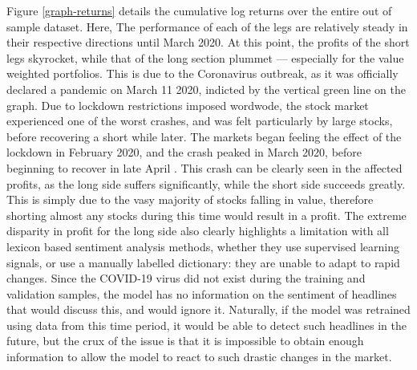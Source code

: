 Figure \ref{graph-returns} details the cumulative log returns over the entire out of sample dataset. Here, The performance of each of the legs are relatively steady in their respective directions until March 2020. At this point, the profits of the short legs skyrocket, while that of the long section plummet --- especially for the value weighted portfolios. This is due to the Coronavirus outbreak, as it was officially declared a pandemic on March 11 2020, indicted by the vertical green line on the graph. Due to lockdown restrictions imposed wordwode, the stock market experienced one of the worst crashes, and was felt particularly by large stocks, before recovering a short while later. The markets began feeling the effect of the lockdown in February 2020, and the crash peaked in March 2020, before beginning to recover in late April \parencite{covid-impact}. This crash can be clearly seen in the affected profits, as the long side suffers significantly, while the short side succeeds greatly. This is simply due to the vasy majority of stocks falling in value, therefore shorting almost any stocks during this time would result in a profit. The extreme disparity in profit for the long side also clearly highlights a limitation with all lexicon based sentiment analysis methods, whether they use supervised learning signals, or use a manually labelled dictionary: they are unable to adapt to rapid changes. Since the COVID-19 virus did not exist during the training and validation samples, the model has no information on the sentiment of headlines that would discuss this, and would ignore it. Naturally, if the model was retrained using data from this time period, it would be able to detect such headlines in the future, but the crux of the issue is that it is impossible to obtain enough information to allow the model to react to such drastic changes in the market.

